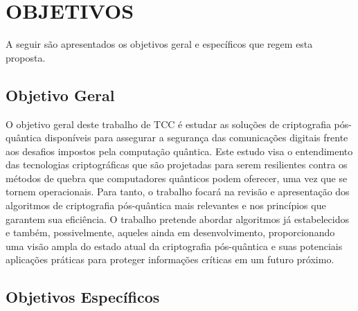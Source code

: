 \section{OBJETIVOS}
\label{sec:objetivos}

A seguir são apresentados os objetivos geral e específicos que regem esta proposta.

\subsection{Objetivo Geral}
\label{subsec:objgeral}
%
%
%
%
%
%


	O objetivo geral deste trabalho de TCC é estudar as soluções de criptografia pós-quântica disponíveis para assegurar a segurança das comunicações digitais frente aos desafios impostos pela computação quântica. Este estudo visa o entendimento das tecnologias criptográficas que são projetadas para serem resilientes contra os métodos de quebra que computadores quânticos podem oferecer, uma vez que se tornem operacionais. Para tanto, o trabalho focará na revisão e apresentação dos algoritmos de criptografia pós-quântica mais relevantes e nos princípios que garantem sua eficiência. O trabalho pretende abordar algoritmos já estabelecidos e também, possivelmente, aqueles ainda em desenvolvimento, proporcionando uma visão ampla do estado atual da criptografia pós-quântica e suas potenciais aplicações práticas para proteger informações críticas em um futuro próximo.



\subsection{Objetivos Específicos}
\label{subsec:objespc}
%
%
%
%
%


